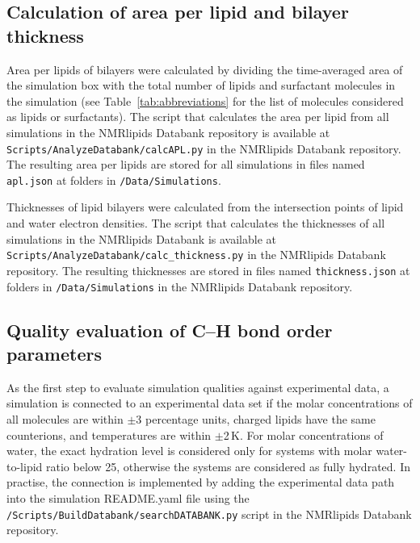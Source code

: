 \documentclass[fleqn,10pt]{wlscirep}
\begin{document}
\subsection{Calculation of area per lipid and bilayer thickness}
Area per lipids of bilayers were calculated by dividing the time-averaged area of the simulation box with the total number of lipids and surfactant molecules in the simulation (see Table~\ref{tab:abbreviations} for the list of molecules considered as lipids or surfactants). The script that calculates the area per lipid from all simulations in the NMRlipids Databank repository is available at \texttt{Scripts/AnalyzeDatabank/calcAPL.py} in the NMRlipids Databank repository. The resulting area per lipids are stored for all simulations in files named \texttt{apl.json} at folders in \texttt{/Data/Simulations}. 

Thicknesses of lipid bilayers were calculated from the intersection points of lipid and water electron densities. The script that calculates the thicknesses of all simulations in the NMRlipids Databank is available at \texttt{Scripts/AnalyzeDatabank/calc\_thickness.py} in the NMRlipids Databank repository. The resulting thicknesses are stored in files named \texttt{thickness.json} at folders in \texttt{/Data/Simulations} in the NMRlipids Databank repository. 

\subsection{Quality evaluation of C--H bond order parameters}
As the first step to evaluate simulation qualities against experimental data, a simulation is connected to an experimental data set if the molar concentrations of all molecules are within $\pm$3 percentage units, charged lipids have the same counterions, and temperatures are within $\pm$2\,K. For molar concentrations of water, the exact hydration level is considered only for systems with molar water-to-lipid ratio below 25, otherwise the systems are considered as fully hydrated. In practise, the connection is implemented by adding the experimental data path into the simulation README.yaml file using the \texttt{/Scripts/BuildDatabank/searchDATABANK.py} script in the NMRlipids Databank repository. 
\end{document}
